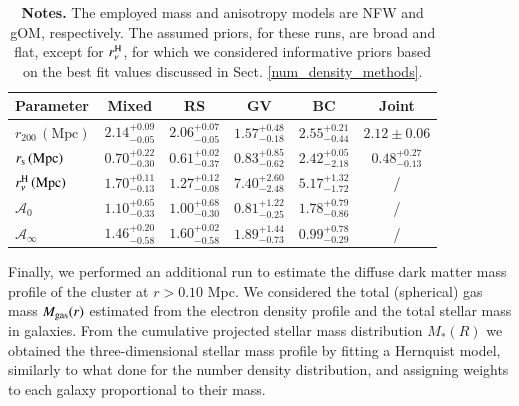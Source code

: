 \documentclass{aa}
\begin{document}
\begin{table}
\centering
\caption{Best fit parameters for the runs with mixed and separated components.}
\renewcommand{\arraystretch}{1.3}
\begin{tabular}{lccccc}
\hline
Parameter & Mixed & RS & {GV} & {BC} & Joint \\
\hline
       
       $r_{200} \, (\mathrm{Mpc})$ & $2.14_{-0.05}^{+0.09}$ & $2.06_{-0.05}^{+0.07}$ & $1.57_{-0.18}^{+0.48}$ & $2.55_{-0.44}^{+0.21}$ & $2.12\pm 0.06$ \\
       $r_{\rm s} \, (\mathrm{Mpc})$ & $0.70_{-0.30}^{+0.22}$ & $0.61_{-0.37}^{+0.02}$ & $0.83_{-0.62}^{+0.85}$ & $2.42_{-2.18}^{+0.05}$ & $0.48_{-0.13}^{+0.27}$ \\
       $r_\nu^{\rm H} \, (\mathrm{Mpc})$ & $1.70_{-0.13}^{+0.11}$ & $1.27_{-0.08}^{+0.12}$ & $7.40_{-2.48}^{+2.60}$ & $5.17_{-1.72}^{+1.32}$ & / \\
       $\mathcal{A}_0$ & $1.10_{-0.33}^{+0.65}$ &
       $1.00_{-0.30}^{+0.68}$ & $0.81_{-0.25}^{+1.22}$ & $1.78_{-0.86}^{+0.79}$ & / \\
       $\mathcal{A}_\infty$ & $1.46_{-0.58}^{+0.20}$ & $1.60_{-0.58}^{+0.02}$ & $1.89_{-0.73}^{+1.44}$ & $0.99_{-0.29}^{+0.78}$ & / \\
          
\hline
\end{tabular}
\caption*{\footnotesize \textbf{Notes.} The employed mass and anisotropy models are NFW and gOM, respectively. The assumed priors, for these runs, are broad and flat, except for $r_\nu^{\rm H}$, for which we considered informative priors based on the best fit values discussed in Sect. \ref{num_density_methods}.}
\label{tab:diff_samples_results}
\end{table}


Finally, we performed an additional run to estimate the diffuse dark matter mass profile of the cluster at $r> 0.10$ Mpc. We considered the total (spherical) gas mass $M_\text{\rm gas}(r)$ estimated from the electron density profile \citep{Mirakhor_2020} and the total stellar mass in galaxies.
From the cumulative projected stellar mass distribution $M_{*}(R)$ we obtained the three-dimensional stellar mass profile by fitting a Hernquist model, similarly to what done for the number density distribution, and assigning weights to each galaxy proportional to their mass. 
\end{document}
